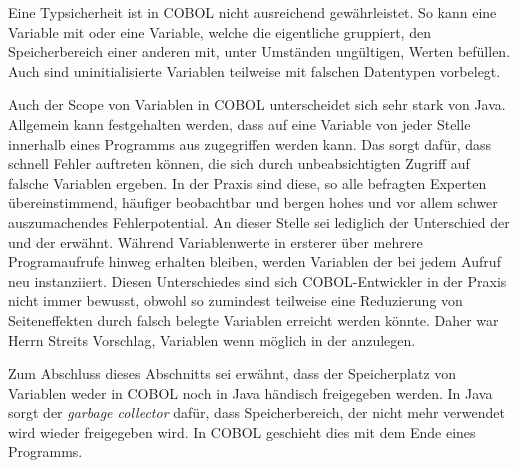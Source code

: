 Eine Typsicherheit ist in COBOL nicht ausreichend gewährleistet. So kann eine Variable mit  oder eine Variable, welche die eigentliche gruppiert, den Speicherbereich einer anderen mit, unter Umständen ungültigen, Werten befüllen. Auch sind uninitialisierte Variablen teilweise mit falschen Datentypen vorbelegt. 

Auch der Scope von Variablen in COBOL unterscheidet sich sehr stark von Java. Allgemein kann festgehalten werden, dass auf eine Variable von jeder Stelle innerhalb eines Programms aus zugegriffen werden kann. Das sorgt dafür, dass schnell Fehler auftreten können, die sich durch unbeabsichtigten Zugriff auf falsche Variablen ergeben. In der Praxis sind diese, so alle befragten Experten übereinstimmend, häufiger beobachtbar und bergen hohes und vor allem schwer auszumachendes Fehlerpotential. An dieser Stelle sei lediglich der Unterschied der  und der  erwähnt. Während Variablenwerte in ersterer über mehrere Programaufrufe hinweg erhalten bleiben, werden Variablen der  bei jedem Aufruf neu instanziiert. Diesen Unterschiedes sind sich COBOL-Entwickler in der Praxis nicht immer bewusst, obwohl so zumindest teilweise eine Reduzierung von Seiteneffekten durch falsch belegte Variablen erreicht werden könnte. Daher war Herrn Streits Vorschlag, Variablen wenn möglich in der  anzulegen.

Zum Abschluss dieses Abschnitts sei erwähnt, dass der Speicherplatz von Variablen weder in COBOL noch in Java händisch freigegeben werden. In Java sorgt der \textit{garbage collector} dafür, dass Speicherbereich, der nicht mehr verwendet wird wieder freigegeben wird. In COBOL geschieht dies mit dem Ende eines Programms. 